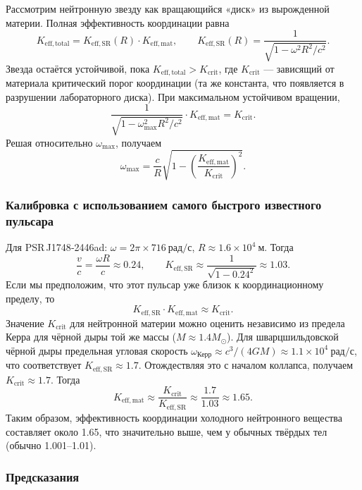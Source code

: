 \documentclass[12pt,a4paper]{article}
\begin{document}
	Рассмотрим нейтронную звезду как вращающийся «диск» из вырожденной материи. Полная эффективность координации равна
	\[
	K_{\mathrm{eff,total}} = K_{\mathrm{eff,SR}}(R) \cdot K_{\mathrm{eff,mat}},
	\qquad
	K_{\mathrm{eff,SR}}(R) = \frac{1}{\sqrt{1 - \omega^2 R^2/c^2}}.
	\]
	Звезда остаётся устойчивой, пока \(K_{\mathrm{eff,total}} > K_{\mathrm{crit}}\), где \(K_{\mathrm{crit}}\) — зависящий от материала критический порог координации (та же константа, что появляется в разрушении лабораторного диска). При максимальном устойчивом вращении,
	\[
	\frac{1}{\sqrt{1 - \omega_{\max}^2 R^2/c^2}} \cdot K_{\mathrm{eff,mat}} = K_{\mathrm{crit}}.
	\]
	Решая относительно \(\omega_{\max}\), получаем
	\[
	\omega_{\max} = \frac{c}{R}\sqrt{1 - \left(\frac{K_{\mathrm{eff,mat}}}{K_{\mathrm{crit}}}\right)^2}.
	\]
	
	\subsubsection{Калибровка с использованием самого быстрого известного пульсара}
	
	Для PSR J1748‑2446ad: \(\omega = 2\pi\times716\ \text{рад/с}\), \(R\approx 1.6\times10^4\ \text{м}\). Тогда
	\[
	\frac{v}{c} = \frac{\omega R}{c} \approx 0.24,\qquad
	K_{\mathrm{eff,SR}} \approx \frac{1}{\sqrt{1-0.24^2}} \approx 1.03.
	\]
	Если мы предположим, что этот пульсар уже близок к координационному пределу, то
	\[
	K_{\mathrm{eff,SR}} \cdot K_{\mathrm{eff,mat}} \approx K_{\mathrm{crit}}.
	\]
	Значение \(K_{\mathrm{crit}}\) для нейтронной материи можно оценить независимо из предела Керра для чёрной дыры той же массы (\(M\approx1.4M_\odot\)). Для шварцшильдовской чёрной дыры предельная угловая скорость \(\omega_{\text{Керр}} \approx c^3/(4GM) \approx 1.1\times10^4\ \text{рад/с}\), что соответствует \(K_{\mathrm{eff,SR}} \approx 1.7\). Отождествляя это с началом коллапса, получаем \(K_{\mathrm{crit}} \approx 1.7\). Тогда
	\[
	K_{\mathrm{eff,mat}} \approx \frac{K_{\mathrm{crit}}}{K_{\mathrm{eff,SR}}} \approx \frac{1.7}{1.03} \approx 1.65.
	\]
	Таким образом, эффективность координации холодного нейтронного вещества составляет около 1.65, что значительно выше, чем у обычных твёрдых тел (обычно 1.001–1.01).
	
	\subsubsection{Предсказания}
	
\end{document}
